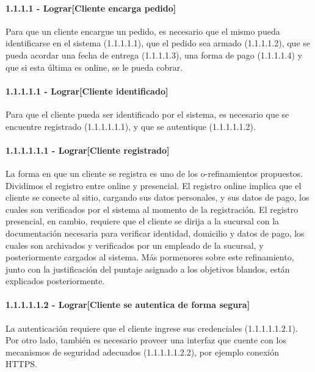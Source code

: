 \clearpage
\paragraph{1.1.1.1 - Lograr[Cliente encarga pedido]} \label{para:1.1.1.1}

Para que un cliente encargue un pedido, es necesario que el mismo pueda
identificarse en el sistema (1.1.1.1.1), que el pedido sea armado (1.1.1.1.2),
que se pueda acordar una fecha de entrega (1.1.1.1.3), una forma de pago
(1.1.1.1.4) y que si esta última es online, se le pueda cobrar.

\paragraph{1.1.1.1.1 - Lograr[Cliente identificado]} \label{para:1.1.1.1.1}

Para que el cliente pueda ser identificado por el sistema, es necesario que se
encuentre registrado (1.1.1.1.1.1), y que se autentique (1.1.1.1.1.2).

\paragraph{1.1.1.1.1.1 - Lograr[Cliente registrado]} \label{para:1.1.1.1.1.1}

La forma en que un cliente se registra es uno de los o-refinamientos
propuestos. Dividimos el registro entre online y presencial. El registro
online implica que el cliente se conecte al sitio, cargando sus datos
personales, y sus datos de pago, los cuales son verificados por el sistema al
momento de la registración. El registro presencial, en cambio, requiere que el
cliente se dirija a la sucursal con la documentación necesaria para verificar
identidad, domicilio y datos de pago, los cuales son archivados y verificados
por un empleado de la sucursal, y posteriormente cargados al sistema. Más
pormenores sobre este refinamiento, junto con la justificación del puntaje
asignado a los objetivos blandos, están explicados posteriormente.

\paragraph{1.1.1.1.1.2 - Lograr[Cliente se autentica de forma segura]} \label{para:1.1.1.1.1.2}

La autenticación requiere que el cliente ingrese sus credenciales
(1.1.1.1.1.2.1). Por otro lado, también es necesario proveer una interfaz que
cuente con los mecanismos de seguridad adecuados (1.1.1.1.1.2.2), por ejemplo
conexión HTTPS.


